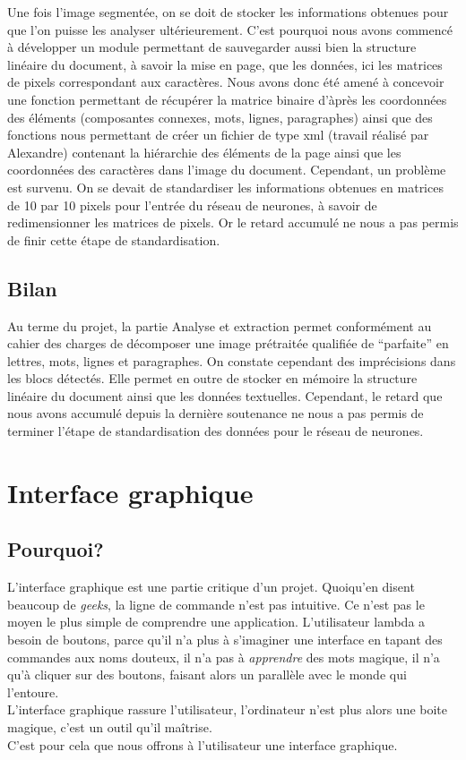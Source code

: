 \documentclass[a4paper,10pt]{report}
\begin{document}
Une fois l'image segment\'ee, on se doit de stocker les informations obtenues pour que l'on puisse
les analyser ult\'erieurement. C'est pourquoi nous avons commenc\'e \`a d\'evelopper un module
permettant de sauvegarder aussi bien la structure lin\'eaire du document, \`a savoir la mise en page,
que les donn\'ees, ici les matrices de pixels correspondant aux caract\`eres. Nous avons donc \'et\'e
amen\'e \`a concevoir une fonction permettant de r\'ecup\'erer la matrice binaire d'\`apr\`es les coordonn\'ees
des \'el\'ements (composantes connexes, mots, lignes, paragraphes) ainsi que des fonctions nous permettant de
cr\'eer un fichier de type xml (travail r\'ealis\'e par Alexandre) contenant la hi\'erarchie des \'el\'ements
de la page ainsi que les coordonn\'ees des caract\`eres dans l'image du document. Cependant, un probl\`eme est
survenu. On se devait de standardiser les informations obtenues en matrices de 10 par 10 pixels pour l'entr\'ee
du r\'eseau de neurones, \`a savoir de redimensionner les matrices de pixels.
Or le retard accumul\'e ne nous a pas permis de finir cette \'etape de standardisation.


\section{Bilan}

Au terme du projet, la partie Analyse et extraction permet conformément au cahier des
charges de décomposer une image prétraitée qualifiée de ``parfaite'' en lettres, mots, lignes
et paragraphes. On constate cependant des imprécisions dans les blocs détectés. Elle
permet en outre de stocker en mémoire la structure linéaire du document ainsi que les
données textuelles. Cependant, le retard que nous avons accumulé depuis la dernière
soutenance ne nous a pas permis de terminer l'étape de standardisation des données pour
le réseau de neurones.



\chapter{Interface graphique} %
\label{cha:interface_graphique}

\section{Pourquoi?} %
\label{sec:pourquoi_}
L’interface graphique est une partie critique d’un projet. Quoiqu’en disent beaucoup de \emph{geeks}, la ligne de commande n’est pas intuitive. Ce n’est pas le moyen le plus simple de comprendre une application. L’utilisateur lambda a besoin de boutons, parce qu’il n’a plus à s’imaginer une interface en tapant des commandes aux noms douteux, il n’a pas à \emph{apprendre} des mots magique, il n’a qu’à cliquer sur des boutons, faisant alors un parallèle avec le monde qui l’entoure. \\
L’interface graphique rassure l’utilisateur, l’ordinateur n’est plus alors une boite magique, c’est un outil qu’il maîtrise. \\
C’est pour cela que nous offrons à l’utilisateur une interface graphique.\\
\end{document}

